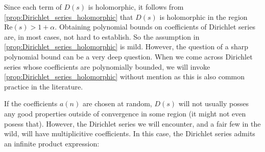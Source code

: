 \documentclass[12pt]{book}
\theoremstyle{definition}\newframedtheorem{method}{Method}
\renewcommand{\a}{\alpha}
\newcommand{\<}{\langle}
\renewcommand{\>}{\rangle}
\renewcommand{\Re}{\mathrm{Re}}
\begin{document}
      Since each term of $D(s)$ is holomorphic, it follows from \cref{prop:Dirichlet_series_holomorphic} that $D(s)$ is holomorphic in the region $\Re(s) > 1+\a$. Obtaining polynomial bounds on coefficients of Dirichlet series are, in most cases, not hard to establish. So the assumption in \cref{prop:Dirichlet_series_holomorphic} is mild. However, the question of a sharp polynomial bound can be a very deep question. When we come across Dirichlet series whose coefficients are polynomially bounded, we will invoke \cref{prop:Dirichlet_series_holomorphic} without mention as this is also common practice in the literature.

      If the coefficients $a(n)$ are chosen at random, $D(s)$ will not usually posses any good properties outside of convergence in some region (it might not even posess that). However, the Dirichlet series we will encounter, and a fair few in the wild, will have multiplicitive coefficients. In this case, the Dirichlet series admits an infinite product expression:
\end{document}
